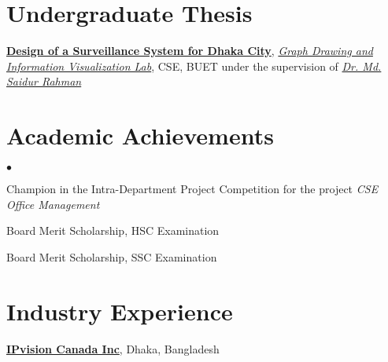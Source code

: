 \documentclass[margin,line]{res}
\newenvironment{list2}{
  \begin{list}{$\bullet$}{%
      \setlength{\itemsep}{0in}
      \setlength{\parsep}{0in} \setlength{\parskip}{0in}
      \setlength{\topsep}{0in} \setlength{\partopsep}{0in} 
      \setlength{\leftmargin}{0.2in}}}{\end{list}}
\begin{document}
\begin{resume}
\vspace*{-.1in}

\section{\sc Undergraduate Thesis} 
\href{https://cse.buet.ac.bd/research/group/gd/index.php?pageid=SurveillanceSystemDhaka}{\bf{Design of a Surveillance System for Dhaka City}}, \textit{\href{https://cse.buet.ac.bd/research/group/gd/index.php?pageid=Home.htm}{Graph Drawing and Information Visualization Lab}}, CSE, BUET under the supervision of \textit{\href{http://teacher.buet.ac.bd/saidurrahman/}{Dr. Md. Saidur Rahman}}
\iffalse
\vspace*{-.15in}
\begin{list2}
\item[ - ] Designed and simulated an integrated system to monitor and control the traffic system of Dhaka
\item[ - ] Applied different shortest path algorithms(Dijkstra's algorithm, Dijkstra's algorithm in a circular or band region and A* Search) on Dhaka city map
\item[ - ] Proposed locations for police-boxes on the prominent road-crossings of Dhaka using 2-Approximation Vertex Cover Algorithm
\item[ - ] Proposed heuristic algorithm that can be applied on clustered map of a large area
\end{list2}
\fi
\vspace*{-.1in}

\section{\sc Academic Achievements} 
\begin{list2}
\item Champion in the Intra-Department Project Competition for the project \textit{CSE Office Management}
\item Board Merit Scholarship, HSC Examination
\item Board Merit Scholarship, SSC Examination
\end{list2}

\vspace*{-.1in}

\section{\sc Industry Experience}
{\bf \href{http://www.ipvision.ca/}{IPvision Canada Inc}}, Dhaka, Bangladesh


\end{resume}
\end{document}
